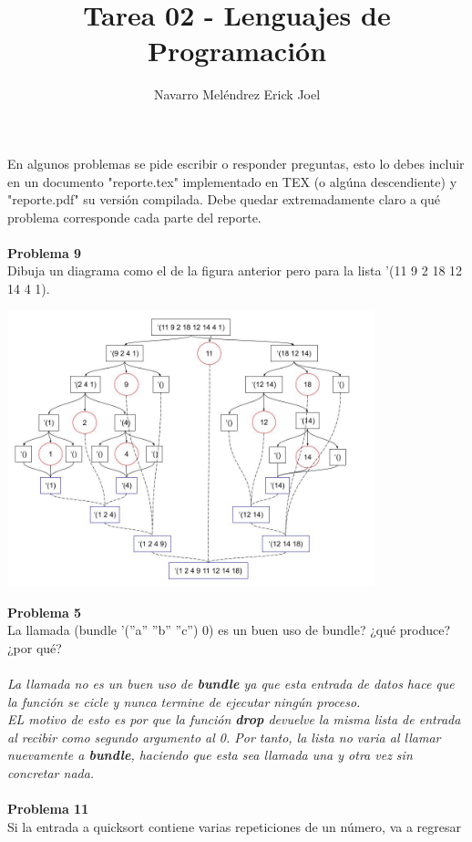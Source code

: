 \documentclass[14pt]{article}
\title{\textbf{Tarea 02 - Lenguajes de Programación}}
\author{Navarro Meléndrez Erick Joel}
\begin{document}
	\maketitle
	En algunos problemas se pide escribir o responder preguntas, esto lo debes incluir en un documento "reporte.tex" implementado en TEX (o algúna descendiente) y "reporte.pdf" su versión compilada. Debe quedar extremadamente claro a qué problema corresponde cada parte del reporte.
	\\
	\\{\large\textbf{Problema 9}}
	\\ Dibuja un diagrama como el de la figura anterior pero para la lista ’(11 9 2 18 12
	14 4 1).
	\\
	\begin{center}
		\includegraphics[width=0.8\textwidth]{Problema9}
	\end{center}
	{\large\textbf{Problema 5}}
	\\ La llamada (bundle ’(”a” ”b” ”c”) 0) es un buen uso de bundle? ¿qué produce?
	¿por qué?
	\\
	\\\textit{La llamada no es un buen uso de \textbf{bundle} ya que esta entrada de datos hace que la función se cicle y nunca termine de ejecutar ningún proceso.
	\\EL motivo de esto es por que la función \textbf{drop} devuelve la misma lista de entrada al recibir como segundo argumento al 0. Por tanto, la lista no varia al llamar nuevamente a \textbf{bundle}, haciendo que esta sea llamada una y otra vez sin concretar nada.}
	\\
	\\{\large\textbf{Problema 11}}
	\\ Si la entrada a quicksort contiene varias repeticiones de un número, va a regresar
\end{document}
